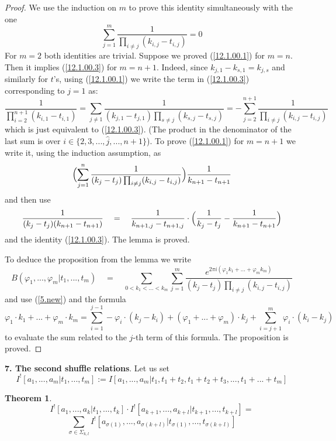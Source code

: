 \documentclass[10pt]{article}
\newtheorem{theorem}{Theorem}[section]
\begin{document}
\begin{proof} 
We use the induction on $m$ to prove this identity simultaneously with the one
\begin{equation} \label{12.1.00.3}
\sum_{j=1}^m \frac{1}{\prod_{i \not = j}(k_{i,j}-t_{i,j}) } = 0
\end{equation}
For $m=2$ both identities are trivial. Suppose we proved (\ref{12.1.00.1})
 for $m=n$. Then it implies (\ref{12.1.00.3}) for $m=n+1$. Indeed, since 
$k_{j,1} - k_{s,1} = k_{j,s}$ and similarly for $t$'s, using  
(\ref{12.1.00.1}) we write the term in (\ref{12.1.00.3})
 corresponding to $j=1$ as:
$$
\frac{1}{\prod_{i = 2}^{n+1}(k_{i,1}-t_{i,1}) } = \sum_{j \not = 1} 
\frac{1}{(k_{j,1} - t_{j,1})\prod_{s \not = j}(k_{s,j}-t_{s,j}) }= 
-\sum_{j=2}^{n+1} \frac{1}{\prod_{i \not = j}(k_{i,j}-t_{i,j}) } 
$$
which is just equivalent to (\ref{12.1.00.3}). (The product in the denominator 
of the last sum is over $i \in \{2, 3, ..., \widehat j, ...,  n+1\}$). To prove 
(\ref{12.1.00.1}) for $m=n+1$ we write it, using the induction assumption, as
$$
\Bigl(\sum_{j=1}^n \frac{1}{(k_j-t_j) \prod_{i \not = j}(k_{i,j}-t_{i,j}) }\Bigr)\frac{1}{k_{n+1}-t_{n+1}}
$$
and then use 
$$
\frac{1}{(k_j-t_j)(k_{n+1}-t_{n+1})} \quad = \quad \frac{1}{k_{ n+1, j} - t_{n+1, j}}\cdot 
\Bigl( \frac{1}{k_j-t_j} - \frac{1}{k_{n+1}-t_{n+1}}\Bigr)
$$
and the identity (\ref{12.1.00.3}). The lemma is proved. 

To deduce the proposition from the lemma we write 
$$
B(\varphi_1, ... , \varphi_m| t_1, ..., 
t_m) \quad = \quad \sum_{0< k_1 < ... < k_m} \sum_{j=1}^{m}\frac{e^{2\pi i 
(\varphi_1 k_1 + ... + \varphi_m k_m)}}{(k_{j} - t_{j})\prod_{i \not = j}(k_{i,j} - t_{i,j})}
$$
and use (\ref{5.new}) and the formula
$$
\varphi_1 \cdot k_1 + ... + \varphi_m \cdot k_m = \sum_{i=1}^{j-1} -\varphi_i \cdot (k_j-k_i)
+  (\varphi_1 + ... + \varphi_m) \cdot k_j + \sum_{i=j+1}^m \varphi_i \cdot (k_i-k_j)
$$
to evaluate the sum related to the  $j$-th term of this formula. 
The proposition is proved. 


\end{proof}

{\bf 7. The second shuffle relations}. Let us set
\begin{equation} \label{shuffle2}
I^![a_1,...,a_m|t_1,...,t_m]:= I[a_1,...,a_m|t_1, t_1+t_2,t_1+t_2+t_3,...,t_1+...+t_m]
\end{equation}

\begin{theorem} \label{shuffle}
\begin{equation} \label{shuffle1}
I^![a_1,...,a_{k}|t_1,...,t_{k}]\cdot
I^![a_{k+1},...,a_{k+l}|t_{k+1},...,t_{k +l}] =
\end{equation}
$$
\sum_{\sigma \in \Sigma_{k,l}}I^![a_{\sigma (1)},...,a_{\sigma (k+l) }|
t_{\sigma ( 1) },...,t_{\sigma (k+l)}]
$$
\end{theorem}
\end{document}
